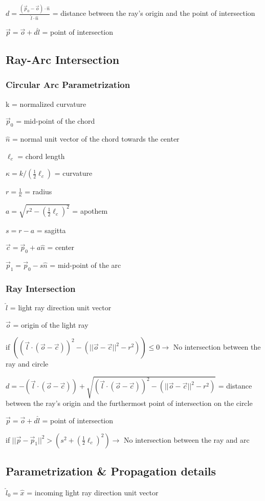 \documentclass{article}
\begin{document}
$d = \frac{(\vec{p}_0 - \vec{o}) \cdot \hat{n}}{\hat{l} \cdot \hat{n}}$ = distance between the ray's origin and the point of intersection

$\vec{p} = \vec{o} + d\hat{l}$ = point of intersection

\subsection{Ray-Arc Intersection}\label{subsec:ray-arc-intersection}
\subsubsection{Circular Arc Parametrization}
k = normalized curvature

$\vec{p}_0$ = mid-point of the chord

$\hat{n}$ = normal unit vector of the chord towards the center

$\ell_c$ = chord length

$\kappa = k / (\frac{1}{2} \ell_c)$ = curvature

$r = \frac{1}{\kappa}$ = radius

$a = \sqrt{r^2 - (\frac{1}{2}\ell_c)^2}$ = apothem

$s = r - a$ = sagitta

$\vec{c} = \vec{p}_0 + a \hat{n}$ = center

$\vec{p}_1 = \vec{p}_0 - s \hat{n}$ = mid-point of the arc

\subsubsection{Ray Intersection}
$\hat{l}$ = light ray direction unit vector

$\vec{o}$ = origin of the light ray

if $((\vec{l} \cdot (\vec{o} - \vec{c}))^2 - (||\vec{o} - \vec{c}||^2 - r^2)) \leq 0 \to $ No intersection between the ray and circle

$d = -(\vec{l} \cdot (\vec{o} - \vec{c})) + \sqrt{(\vec{l} \cdot (\vec{o} - \vec{c}))^2 - (||\vec{o} - \vec{c}||^2 - r^2)}$
= distance between the ray's origin and the furthermost point of intersection on the circle

$\vec{p} = \vec{o} + d\hat{l}$ = point of intersection

if $||\vec{p} - \vec{p}_1||^2 > (s^2 + (\frac{1}{2}\ell_c)^2) \to $ No intersection between the ray and arc

\subsection{Parametrization \& Propagation details}\label{subsec:parametrization&propagation-details}
$\hat{l}_0 = \hat{x}$ = incoming light ray direction unit vector
\end{document}
